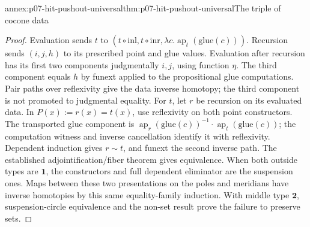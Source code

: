 \begin{annexitem}{annex:p07-hit-pushout-universal}{thm:p07-hit-pushout-universal}{The triple of cocone data}
\begin{proof}
Evaluation sends \(t\) to \((t\circ\mathrm{inl},t\circ\mathrm{inr},
\lambda c.\operatorname{ap}_t(\mathrm{glue}(c)))\). Recursion sends
\((i,j,h)\) to its prescribed point and glue values. Evaluation after
recursion has its first two components judgmentally \(i,j\), using
function \(\eta\). The third component equals \(h\) by funext applied
to the propositional glue computations. Pair paths over reflexivity give
the data inverse homotopy; the third component is not promoted to judgmental
equality. For \(t\), let \(r\) be recursion on its evaluated data.
In \(P(x):=r(x)=t(x)\), use reflexivity on both point constructors.
The transported glue component is
\(\operatorname{ap}_r(\mathrm{glue}(c))^{-1}\cdot
\operatorname{ap}_t(\mathrm{glue}(c))\); the computation witness and
inverse cancellation identify it with reflexivity. Dependent induction gives
\(r\sim t\), and funext the second inverse path. The established
adjointification/fiber theorem gives equivalence.
When both outside types are \(\mathbf1\), the constructors and full
dependent eliminator are the suspension ones. Maps between these two
presentations on the poles and meridians have inverse homotopies by this same
equality-family induction. With middle type \(\mathbf2\), suspension-circle
equivalence and the non-set result prove the failure to preserve sets.
\end{proof}
\end{annexitem}

